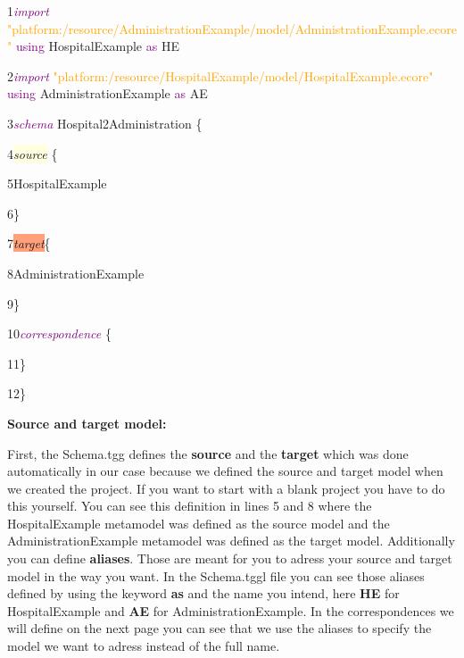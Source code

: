 {

1\hspace{0.5cm}\textcolor{Purple}{\textit{import}} \textcolor{Orange}{"platform:/resource/AdministrationExample/model/AdministrationExample.ecore"} \textcolor{Purple}{using} HospitalExample \textcolor{Purple}{as} HE

2\hspace{0.5cm}\textcolor{Purple}{\textit{import}} \textcolor{Orange}{"platform:/resource/HospitalExample/model/HospitalExample.ecore"} \textcolor{Purple}{using} AdministrationExample \textcolor{Purple}{as} AE

3\hspace{0.5cm}\textcolor{Purple}{\textit{schema}} Hospital2Administration \{

4\hspace{0.5cm}\colorbox{LightYellow}{\textit{source}} \{

5\hspace{1cm}HospitalExample

6\hspace{0.5cm}\}

7\hspace{0.5cm}\colorbox{LightSalmon}{\textit{target}}\{ 

8\hspace{1cm}AdministrationExample

9\hspace{0.5cm}\} 

10\hspace{0.5cm}\textcolor{Purple}{\textit{correspondence}} \{

11\hspace{0.5cm}\}

12\hspace{0.5cm}\}\newline

}


\textbf{Source and target model:}

First, the Schema.tgg defines the \textbf{source} and the \textbf{target} which was done automatically in our case because we defined the source and target model when we created the project. If you want to start with a blank project you have to do this yourself. You can see this definition in lines 5 and 8 where the \textsf{HospitalExample} metamodel was defined as the source model and the \textsf{AdministrationExample} metamodel was defined as the target model.\newline
Additionally you can define \textbf{aliases}. Those are meant for you to adress your source and target model in the way you want. In the Schema.tggl file you can see those aliases defined by using the keyword \textbf{as} and the name you intend, here \textbf{HE} for HospitalExample and \textbf{AE} for AdministrationExample. In the correspondences we will define on the next page you can see that we use the aliases to specify the model we want to adress instead of the full name.\newline

